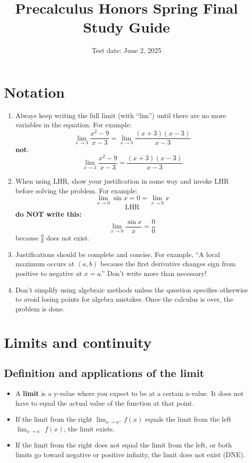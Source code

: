 \documentclass[letterpaper, 12pt]{article}
\title{Precalculus Honors Spring Final Study Guide}
\date{Test date: June 2, 2025}
\begin{document}
\maketitle

\section*{Notation}
\begin{enumerate}
\item Always keep writing the full limit (with ``lim'') until there are no more variables in the equation. For example:
$$\lim_{x \to 3} \frac{x^2-9}{x-3} = \lim_{x \to 3} \frac{(x+3)(x-3)}{x-3}$$
\textbf{not}:
$$\lim_{x \to 3} \frac{x^2-9}{x-3} =\frac{(x+3)(x-3)}{x-3}$$
\item When using LHR, show your justification in some way and invoke LHR before solving the problem. For example:
$$\lim_{x \to 0}{\sin x} = 0 = \lim_{x \to 0}{x}$$
$$\mathrm{LHR}$$
\textbf{do NOT write this:}
$$\lim_{x \to 0} \frac{\sin x}{x} = \frac{0}{0}$$
because $\frac{0}{0}$ does not exist.
\item Justifications should be complete and concise. For example, ``A local maximum occurs at $(a, b)$ because the first derivative changes sign from positive to negative at $x = a$.'' Don't write more than necessary!
\item Don't simplify using algebraic methods unless the question specifies otherwise to avoid losing points for algebra mistakes. Once the calculus is over, the problem is done.
\end{enumerate}

\section*{Limits and continuity}

\subsection*{Definition and applications of the limit}

\begin{itemize}

\item A \textbf{limit} is a y-value where you expect to be at a certain x-value. It does not have to equal the actual value of the function at that point.

\item If the limit from the right $\displaystyle\lim_{x \to a^+} f(x)$ equals the limit from the left $\displaystyle\lim_{x \to a^-} f(x)$, the limit exists. 

\item If the limit from the right does not equal the limit from the left, or both limits go toward negative or positive infinity, the limit does not exist (DNE).

\end{itemize}
\end{document}

